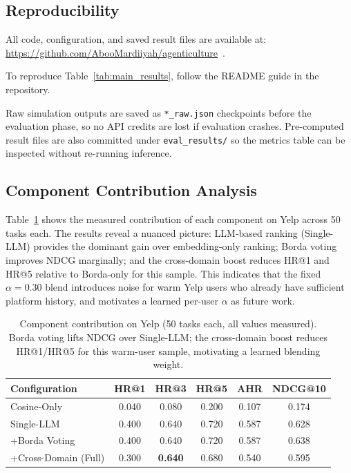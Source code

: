 \documentclass[11pt]{article}
\begin{document}
\subsection{Reproducibility}
All code, configuration, and saved result files are available at:
\url{https://github.com/AbooMardiiyah/agenticulture}~\citep{aboomidou2026agenticulture}.

\noindent To reproduce Table~\ref{tab:main_results}, follow the README guide in the repository.

Raw simulation outputs are saved as \texttt{*\_raw.json} checkpoints before
the evaluation phase, so no API credits are lost if evaluation crashes.
Pre-computed result files are also committed under \texttt{eval\_results/}
so the metrics table can be inspected without re-running inference.

\subsection{Component Contribution Analysis}

Table~\ref{tab:ablation} shows the measured contribution of each component
on Yelp across 50 tasks each.
The results reveal a nuanced picture: LLM-based ranking (Single-LLM) provides
the dominant gain over embedding-only ranking; Borda voting improves NDCG
marginally; and the cross-domain boost reduces HR@1 and HR@5 relative to
Borda-only for this sample.
This indicates that the fixed $\alpha = 0.30$ blend introduces noise for
warm Yelp users who already have sufficient platform history, and motivates
a learned per-user $\alpha$ as future work.

\begin{table}[H]
\centering
\begin{tabular}{lccccc}
\toprule
\textbf{Configuration} & \textbf{HR@1} & \textbf{HR@3} & \textbf{HR@5} & \textbf{AHR} & \textbf{NDCG@10} \\
\midrule
Cosine-Only          & 0.040 & 0.080 & 0.200 & 0.107 & 0.174 \\
Single-LLM           & 0.400 & 0.640 & 0.720 & 0.587 & 0.628 \\
+Borda Voting        & 0.400 & 0.640 & 0.720 & 0.587 & 0.638 \\
+Cross-Domain (Full) & 0.300 & \textbf{0.640} & 0.680 & 0.540 & 0.595 \\
\bottomrule
\end{tabular}
\caption{Component contribution on Yelp (50 tasks each, all values measured).
  Borda voting lifts NDCG over Single-LLM; the cross-domain boost reduces
  HR@1/HR@5 for this warm-user sample, motivating a learned blending weight.}
\label{tab:ablation}
\end{table}
\end{document}
